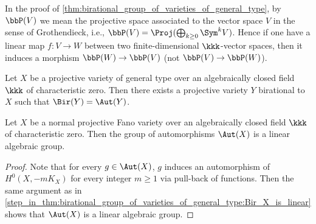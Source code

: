     \begin{remark}\label{rmk_on_finite_birational_group_of_general_type:projection_in_the_sense_of_Grothendieck_and_its_dual}
        In the proof of \cref{thm:birational_group_of_varieties_of_general_type}, by \(\bbP(V)\) we mean the projective space associated to the vector space \(V\) in the sense of Grothendieck, i.e., \(\bbP(V) = \Proj(\bigoplus_{k \geq 0} \Sym^k V)\).
        Hence if one have a linear map \(f: V \to W\) between two finite-dimensional \(\kkk\)-vector spaces, then it induces a morphism \(\bbP(W) \to \bbP(V)\) (not \(\bbP(V) \to \bbP(W)\)).
    \end{remark}

    \begin{corollary}\label{cor:regularization_of_birational_group_of_varieties_of_general_type}
        Let \(X\) be a projective variety of general type over an algebraically closed field \(\kkk\) of characteristic zero. 
        Then there exists a projective variety \(Y\) birational to \(X\) such that \(\Bir(Y) = \Aut(Y)\).
    \end{corollary}

    \begin{corollary}\label{cor:automorphism_group_of_Fano_varieties_is_linear}
        Let \(X\) be a normal projective Fano variety over an algebraically closed field \(\kkk\) of characteristic zero. 
        Then the group of automorphisms \(\Aut(X)\) is a linear algebraic group.
    \end{corollary}
    \begin{proof}
        Note that for every \(g \in \Aut(X)\), \(g\) induces an automorphism of \(H^0(X, -mK_X)\) for every integer \(m \geq 1\) via pull-back of functions.
        Then the same argument as in \cref{step_in_thm:birational_group_of_varieties_of_general_type:Bir_X_is_linear} shows that \(\Aut(X)\) is a linear algebraic group.
    \end{proof}

    
